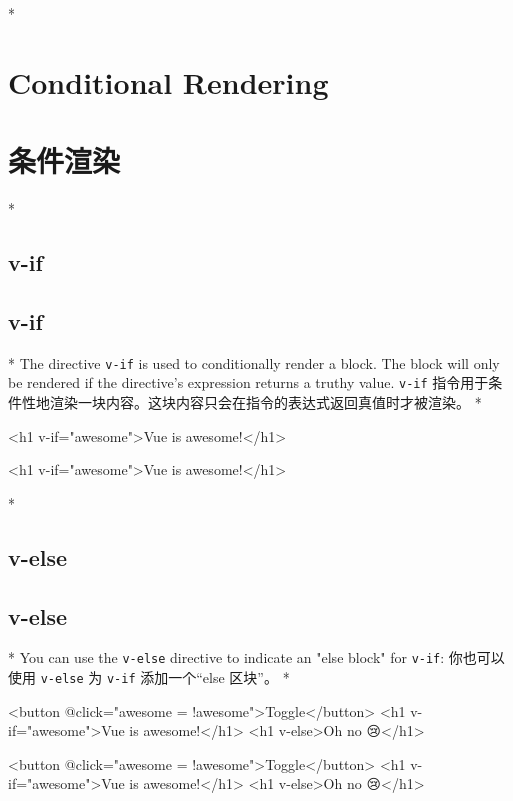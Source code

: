 \begin{paracol}{2}

\switchcolumn[0]*%
\section{Conditional Rendering}
\switchcolumn
\section{条件渲染}
\switchcolumn[0]*%
\subsection{v-if}
\switchcolumn
\subsection{v-if}
\switchcolumn[0]*%
The directive \texttt{v-if} is used to conditionally render a block. The
block will only be rendered if the directive's expression returns a
truthy value.
\switchcolumn
\texttt{v-if}
指令用于条件性地渲染一块内容。这块内容只会在指令的表达式返回真值时才被渲染。
\switchcolumn[0]*%
\begin{codeHtml}
<h1 v-if="awesome">Vue is awesome!</h1>
\end{codeHtml}
\switchcolumn
\begin{codeHtml}
<h1 v-if="awesome">Vue is awesome!</h1>
\end{codeHtml}
\switchcolumn[0]*%
\subsection{v-else}
\switchcolumn
\subsection{v-else}
\switchcolumn[0]*%
You can use the \texttt{v-else} directive to indicate an "else block"
for \texttt{v-if}:
\switchcolumn
你也可以使用 \texttt{v-else} 为 \texttt{v-if} 添加一个``else 区块''。
\switchcolumn[0]*%
\begin{codeHtml}
<button @click="awesome = !awesome">Toggle</button>
<h1 v-if="awesome">Vue is awesome!</h1>
<h1 v-else>Oh no 😢</h1>
\end{codeHtml}
\switchcolumn
\begin{codeHtml}
<button @click="awesome = !awesome">Toggle</button>
<h1 v-if="awesome">Vue is awesome!</h1>
<h1 v-else>Oh no 😢</h1>
\end{codeHtml}


\end{paracol}
